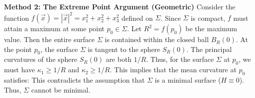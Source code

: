 \begin{solution}
\textbf{Method 2: The Extreme Point Argument (Geometric)}
Consider the function $f(\vec{x}) = |\vec{x}|^2 = x_1^2 + x_2^2 + x_3^2$ defined on $\Sigma$.
Since $\Sigma$ is compact, $f$ must attain a maximum at some point $p_0 \in \Sigma$.
Let $R^2 = f(p_0)$ be the maximum value. Then the entire surface $\Sigma$ is contained within the closed ball $B_R(0)$.
At the point $p_0$, the surface $\Sigma$ is tangent to the sphere $S_R(0)$.
The principal curvatures of the sphere $S_R(0)$ are both $1/R$.
Thus, for the surface $\Sigma$ at $p_0$, we must have $\kappa_1 \ge 1/R$ and $\kappa_2 \ge 1/R$.
This implies that the mean curvature at $p_0$ satisfies:
This contradicts the assumption that $\Sigma$ is a minimal surface ($H \equiv 0$).
Thus, $\Sigma$ cannot be minimal.
\end{solution}

